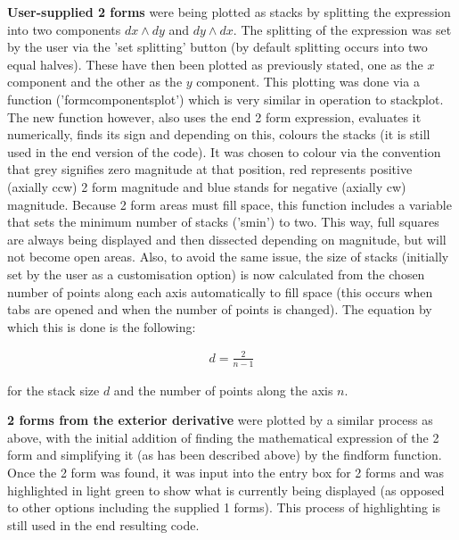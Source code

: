 \documentclass[11]{report}
\begin{document}
\textbf{User-supplied 2 forms} were being plotted as stacks by splitting the expression into two components $dx\wedge dy$ and $dy\wedge dx$. The splitting of the expression was set by the user via the 'set splitting' button (by default splitting occurs into two equal halves). These have then been plotted as previously stated, one as the $x$ component and the other as the $y$ component. This plotting was done via a function ('form\textunderscore components\textunderscore plot') which is very similar in operation to stack\textunderscore plot. The new function however, also uses the end 2 form expression, evaluates it numerically, finds its sign and depending on this, colours the stacks (it is still used in the end version of the code). It was chosen to colour via the convention that grey signifies zero magnitude at that position, red represents positive (axially ccw) 2 form magnitude and blue stands for negative (axially cw) magnitude. Because 2 form areas must fill space, this function includes a variable that sets the minimum number of stacks ('s\textunderscore min') to two. This way, full squares are always being displayed and then dissected depending on magnitude, but will not become open areas. Also, to avoid the same issue, the size of stacks (initially set by the user as a customisation option) is now calculated from the chosen number of points along each axis automatically to fill space (this occurs when tabs are opened and when the number of points is changed). The equation by which this is done is the following:

\begin{equation}
	\label{T2} \begin{split}
		d = \frac{2}{n-1}
	\end{split}
\end{equation}

for the stack size $d$ and the number of points along the axis $n$. 


\textbf{2 forms from the exterior derivative} were plotted by a similar process as above, with the initial addition of finding the mathematical expression of the 2 form and simplifying it (as has been described above) by the find\textunderscore form function. Once the 2 form was found, it was input into the entry box for 2 forms and was highlighted in light green to show what is currently being displayed (as opposed to other options including the supplied 1 forms). This process of highlighting is still used in the end resulting code. 
\end{document}

